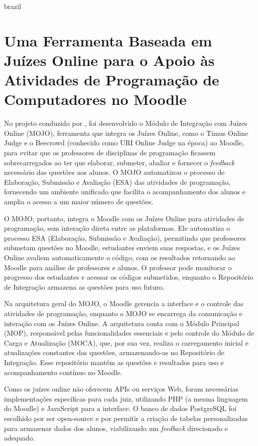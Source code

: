 \begin{otherlanguage*}{brazil}
\section{Uma Ferramenta Baseada em Juízes Online para o Apoio às Atividades de Programação de Computadores no Moodle}

No projeto conduzido por \textcite{joseosvaldochaves}, foi desenvolvido o Módulo de Integração com Juízes Online (MOJO), ferramenta que integra os Juízes Online, como o Timus Online Judge e o Beecrowd (conhecido como URI Online Judge na época) ao Moodle, para evitar que os professores de disciplinas de programação ficassem sobrecarregados ao ter que elaborar, submeter, abaliar e fornecer o \textit{feedback} necessário das questões aos alunos. O MOJO automatizou o processo de Elaboração, Submissão e Avaliação (ESA) das atividades de programação, fornecendo um ambiente unificado que facilita o acompanhamento dos alunos e amplia o acesso a um maior número de questões.

O MOJO, portanto, integra o Moodle com os Juízes Online para atividades de programação, sem interação direta entre as plataformas. Ele automatiza o processo ESA (Elaboração, Submissão e Avaliação), permitindo que professores submetam questões no Moodle, estudantes enviem suas respostas, e os Juízes Online avaliem automaticamente o código, com os resultados retornando ao Moodle para análise de professores e alunos. O professor pode monitorar o progresso dos estudantes e acessar os códigos submetidos, enquanto o Repositório de Integração armazena as questões para uso futuro.

Na arquitetura geral do MOJO, o Moodle gerencia a interface e o controle das atividades de programação, enquanto o MOJO se encarrega da comunicação e interação com os Juízes Online. A arquitetura conta com o Módulo Principal (MOP), responsável pelas funcionalidades essenciais e pelo controle do Módulo de Carga e Atualização (MOCA), que, por sua vez, realiza o carregamento inicial e atualizações constantes das questões, armazenando-as no Repositório de Integração. Esse repositório mantém as questões e resultados para uso e acompanhamento contínuo no Moodle.

Como os juízes online não oferecem APIs ou serviços Web, foram necessárias implementações específicas para cada juiz, utilizando PHP (a mesma linguagem do Moodle) e JavaScript para a interface. O banco de dados PostgreSQL foi escolhido por ser open-source e por permitir a criação de tabelas personalizadas para armazenar dados dos alunos, viabilizando um \textit{feedback} direcionado e adequado.


\end{otherlanguage*}
